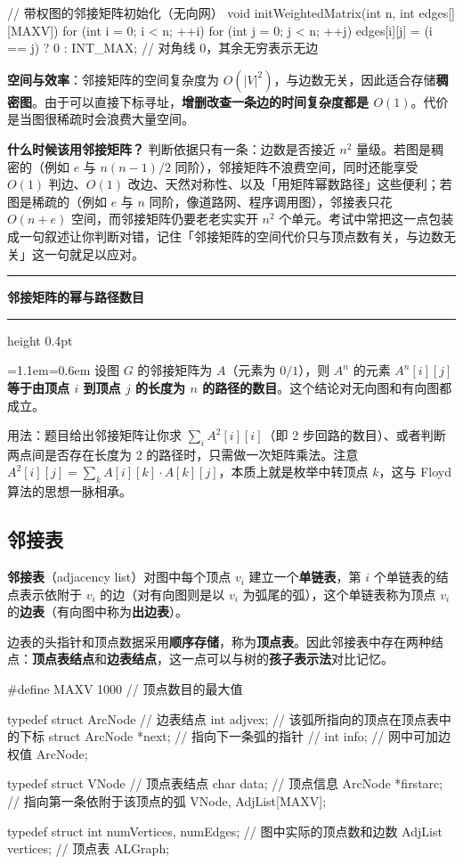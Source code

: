 \documentclass[11pt,openany,UTF8]{ctexbook}
\newcommand{\callouthead}[2]{%
  \par\addvspace{7pt}\noindent
  {\color{#1}\rule[-0.15em]{3pt}{1.05em}}\hspace{0.5em}%
  {\bfseries\color{#1}#2}\par\nobreak\vspace{-0.35em}%
  {\color{rulesep}\hrule height 0.4pt}\nobreak\vspace{0.45em}%
  \begingroup\small\setlength{\parindent}{0pt}%
  \leftskip=1.1em\rightskip=0.6em\noindent\ignorespaces}
\newcommand{\calloutend}{\par\endgroup\addvspace{7pt}}
\newenvironment{callkey}[1]{\callouthead{keybar}{#1}}{\calloutend}
\begin{document}
\begin{codebox}
// 带权图的邻接矩阵初始化（无向网）
void initWeightedMatrix(int n, int edges[][MAXV]) {
    for (int i = 0; i < n; ++i)
        for (int j = 0; j < n; ++j)
            edges[i][j] = (i == j) ? 0 : INT_MAX;   // 对角线 0，其余无穷表示无边
}
\end{codebox}

\textbf{空间与效率}：邻接矩阵的空间复杂度为 $O(|V|^2)$，与边数无关，因此适合存储\textbf{稠密图}。由于可以直接下标寻址，\textbf{增删改查一条边的时间复杂度都是 $O(1)$}。代价是当图很稀疏时会浪费大量空间。

\textbf{什么时候该用邻接矩阵？} 判断依据只有一条：边数是否接近 $n^2$ 量级。若图是稠密的（例如 $e$ 与 $n(n-1)/2$ 同阶），邻接矩阵不浪费空间，同时还能享受 $O(1)$ 判边、$O(1)$ 改边、天然对称性、以及「用矩阵幂数路径」这些便利；若图是稀疏的（例如 $e$ 与 $n$ 同阶，像道路网、程序调用图），邻接表只花 $O(n+e)$ 空间，而邻接矩阵仍要老老实实开 $n^2$ 个单元。考试中常把这一点包装成一句叙述让你判断对错，记住「邻接矩阵的空间代价只与顶点数有关，与边数无关」这一句就足以应对。

\begin{callkey}{邻接矩阵的幂与路径数目}
设图 $G$ 的邻接矩阵为 $A$（元素为 $0/1$），则 $A^{n}$ 的元素 $A^{n}[i][j]$ \textbf{等于由顶点 $i$ 到顶点 $j$ 的长度为 $n$ 的路径的数目}。这个结论对无向图和有向图都成立。

用法：题目给出邻接矩阵让你求 $\sum_i A^{2}[i][i]$（即 2 步回路的数目）、或者判断两点间是否存在长度为 2 的路径时，只需做一次矩阵乘法。注意 $A^{2}[i][j]=\sum_{k}A[i][k]\cdot A[k][j]$，本质上就是枚举中转顶点 $k$，这与 Floyd 算法的思想一脉相承。

\end{callkey}

\subsection{邻接表}

\textbf{邻接表}（adjacency list）对图中每个顶点 $v_i$ 建立一个\textbf{单链表}，第 $i$ 个单链表的结点表示依附于 $v_i$ 的边（对有向图则是以 $v_i$ 为弧尾的弧），这个单链表称为顶点 $v_i$ 的\textbf{边表}（有向图中称为\textbf{出边表}）。

边表的头指针和顶点数据采用\textbf{顺序存储}，称为\textbf{顶点表}。因此邻接表中存在两种结点：\textbf{顶点表结点}和\textbf{边表结点}，这一点可以与树的\textbf{孩子表示法}对比记忆。

\begin{codebox}
#define MAXV 1000                 // 顶点数目的最大值

typedef struct ArcNode {          // 边表结点
    int adjvex;                   // 该弧所指向的顶点在顶点表中的下标
    struct ArcNode *next;         // 指向下一条弧的指针
    // int info;                  // 网中可加边权值
} ArcNode;

typedef struct VNode {            // 顶点表结点
    char data;                    // 顶点信息
    ArcNode *firstarc;            // 指向第一条依附于该顶点的弧
} VNode, AdjList[MAXV];

typedef struct {
    int numVertices, numEdges;    // 图中实际的顶点数和边数
    AdjList vertices;             // 顶点表
} ALGraph;
\end{codebox}
\end{document}
